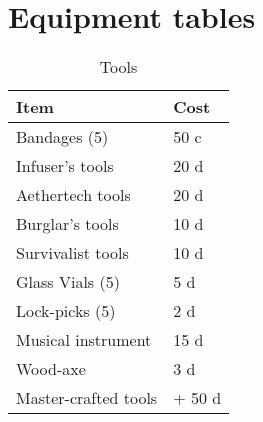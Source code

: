 \documentclass[a4paper,11pt,oneside]{book}
\begin{document}
\chapter{Equipment tables}
\begin{table}[ht]
	\centering
	\caption{Tools}
	\label{tab:tools}
	\begin{tabular}{|l|l|}
		\hline
		Item & Cost\\ [0.5ex]
		\hline
		Bandages (5)& 50 c\\
		Infuser's tools & 20 d\\
		Aethertech tools & 20 d \\
		Burglar's tools & 10 d \\
		Survivalist tools & 10 d \\
		Glass Vials (5)& 5 d\\
		Lock-picks (5) & 2 d\\
		Musical instrument & 15 d\\
		Wood-axe & 3 d\\		
		\hline
		Master-crafted tools & + 50 d\\
		\hline
	\end{tabular}
\end{table}
\end{document}

